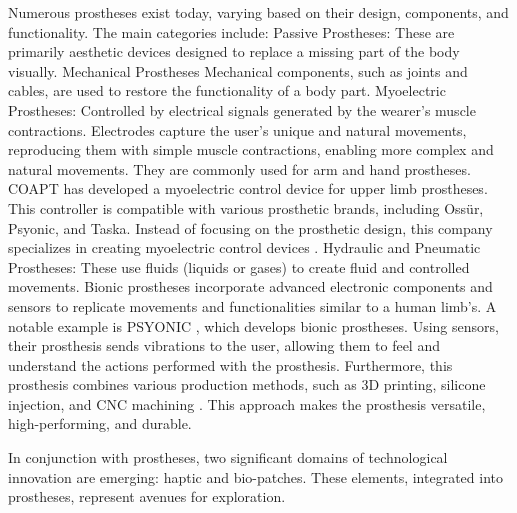 


Numerous prostheses exist today, varying based on their design, components, and functionality. The main categories include:
Passive Prostheses: These are primarily aesthetic devices designed to replace a missing part of the body visually.
Mechanical Prostheses Mechanical components, such as joints and cables, are used to restore the functionality of a body part.
Myoelectric Prostheses: Controlled by electrical signals generated by the wearer's muscle contractions. Electrodes capture the user's unique and natural movements, reproducing them with simple muscle contractions, enabling more complex and natural movements. They are commonly used for arm and hand prostheses. COAPT has developed a myoelectric control device for upper limb prostheses. This controller is compatible with various prosthetic brands, including Ossür, Psyonic, and Taska. Instead of focusing on the prosthetic design, this company specializes in creating myoelectric control devices \cite{noauthor_coapt_nodate}.
Hydraulic and Pneumatic Prostheses: These use fluids (liquids or gases) to create fluid and controlled movements.
Bionic prostheses incorporate advanced electronic components and sensors to replicate movements and functionalities similar to a human limb’s. A notable example is PSYONIC \cite{noauthor_psyonic_nodate}, which develops bionic prostheses. Using sensors, their prosthesis sends vibrations to the user, allowing them to feel and understand the actions performed with the prosthesis. Furthermore, this prosthesis combines various production methods, such as 3D printing, silicone injection, and CNC machining \cite{noauthor_advanced_nodate}. This approach makes the prosthesis versatile, high-performing, and durable.

In conjunction with prostheses, two significant domains of technological innovation are emerging: haptic and bio-patches. These elements, integrated into prostheses, represent avenues for exploration.

